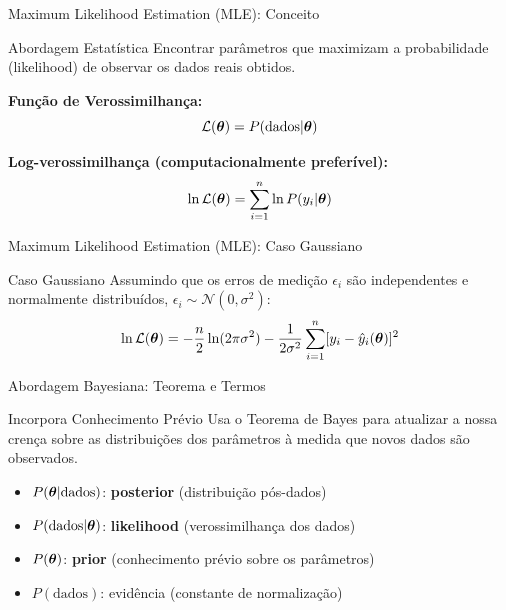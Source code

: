 \begin{frame}{Maximum Likelihood Estimation (MLE): Conceito}
\begin{block}{Abordagem Estatística}
Encontrar parâmetros que maximizam a probabilidade (likelihood) de observar os dados reais obtidos.
\end{block}

\textbf{Função de Verossimilhança:}
\begin{equation*}
\mathcal{L}(\boldsymbol{\theta}) = P(\text{dados} | \boldsymbol{\theta})
\end{equation*}

\textbf{Log-verossimilhança (computacionalmente preferível):}
\begin{equation*}
\ln \mathcal{L}(\boldsymbol{\theta}) = \sum_{i=1}^{n} \ln P(y_i | \boldsymbol{\theta})
\end{equation*}
\end{frame}

\begin{frame}{Maximum Likelihood Estimation (MLE): Caso Gaussiano}
\begin{exampleblock}{Caso Gaussiano}
Assumindo que os erros de medição $\epsilon_i$ são independentes e normalmente distribuídos, $\epsilon_i \sim \mathcal{N}(0, \sigma^2)$:
\begin{equation*}
\ln \mathcal{L}(\boldsymbol{\theta}) = -\frac{n}{2}\ln(2\pi\sigma^2) - \frac{1}{2\sigma^2}\sum_{i=1}^{n}[y_i - \hat{y}_i(\boldsymbol{\theta})]^2
\end{equation*}
\end{exampleblock}

\vspace{0.3cm}
\end{frame}

\begin{frame}{Abordagem Bayesiana: Teorema e Termos}
\begin{block}{Incorpora Conhecimento Prévio}
Usa o Teorema de Bayes para atualizar a nossa crença sobre as distribuições dos parâmetros à medida que novos dados são observados.
\end{block}


\begin{itemize}
    \item $P(\boldsymbol{\theta} | \text{dados})$: \textbf{posterior} (distribuição pós-dados)
    \item $P(\text{dados} | \boldsymbol{\theta})$: \textbf{likelihood} (verossimilhança dos dados)
    \item $P(\boldsymbol{\theta})$: \textbf{prior} (conhecimento prévio sobre os parâmetros)
    \item $P(\text{dados})$: evidência (constante de normalização)
\end{itemize}
\end{frame}

